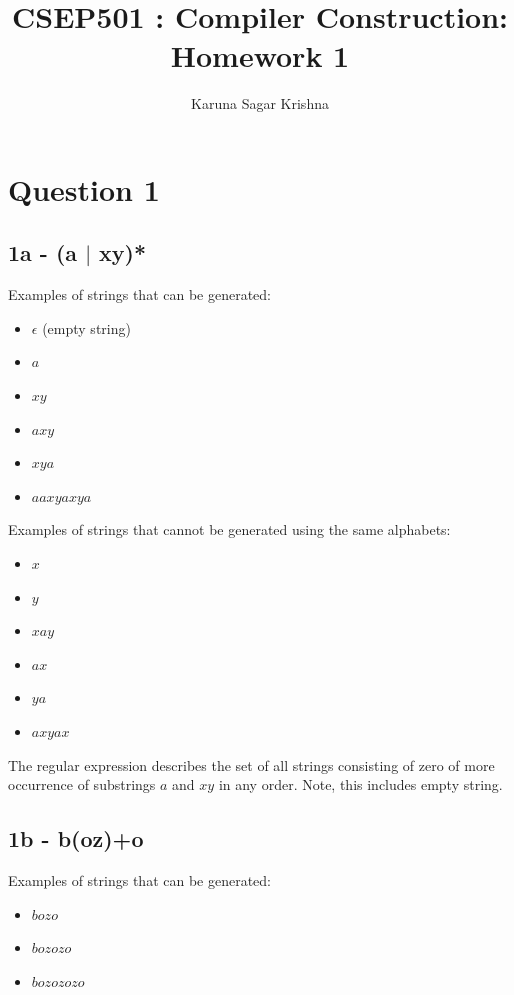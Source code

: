 \documentclass{article}
\title{CSEP501 : Compiler Construction: Homework 1}
\author{Karuna Sagar Krishna}
\begin{document}
    \maketitle

    \section*{Question 1}

    \subsection*{1a - \textbf{(a $|$ xy)*}}
    Examples of strings that can be generated:
    \begin{itemize}
        \item $\epsilon$ (empty string)
        \item $a$
        \item $xy$
        \item $axy$
        \item $xya$
        \item $aaxyaxya$
    \end{itemize}

    Examples of strings that cannot be generated using the same alphabets:
    \begin{itemize}
        \item $x$
        \item $y$
        \item $xay$
        \item $ax$
        \item $ya$
        \item $axyax$
    \end{itemize}

    The regular expression describes the set of all strings consisting of zero of more occurrence of substrings $a$ and $xy$ in any order. Note, this includes empty string.

    \subsection*{1b - \textbf{b(oz)+o}}
    Examples of strings that can be generated:
    \begin{itemize}
        \item $bozo$
        \item $bozozo$
        \item $bozozozo$
    \end{itemize}
\end{document}
